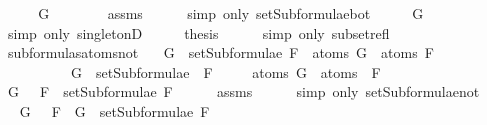 \begin{isabellebody}
%
\isadelimproof
%
\endisadelimproof
%
\isatagproof
{}\isamarkupfalse%
\ {\isacharminus}\isanewline
\ \ \isamarkupfalse%
\ {\isachardoublequoteopen}G\ {\isasymin}\ {\isacharbraceleft}{\isasymbottom}{\isacharbraceright}{\isachardoublequoteclose}\isanewline
\ \ \ \ \isamarkupfalse%
\ assms\isanewline
\ \ \ \ \isamarkupfalse%
\ {\isacharparenleft}simp\ only{\isacharcolon}\ setSubformulae{\isacharunderscore}bot{\isacharparenright}\isanewline
\ \ \isamarkupfalse%
\ \isamarkupfalse%
\ {\isachardoublequoteopen}G\ {\isacharequal}\ {\isasymbottom}{\isachardoublequoteclose}\isanewline
\ \ \ \ \isamarkupfalse%
\ {\isacharparenleft}simp\ only{\isacharcolon}\ singletonD{\isacharparenright}\isanewline
\ \ \isamarkupfalse%
\ \isamarkupfalse%
\ {\isacharquery}thesis\isanewline
\ \ \ \ \isamarkupfalse%
\ {\isacharparenleft}simp\ only{\isacharcolon}\ subset{\isacharunderscore}refl{\isacharparenright}\isanewline
{}\isamarkupfalse%
%
\endisatagproof
{\isafoldproof}%
%
\isadelimproof
\isanewline
%
\endisadelimproof
\isanewline
{}\isamarkupfalse%
\ subformulas{\isacharunderscore}atoms{\isacharunderscore}not{\isacharcolon}\isanewline
\ \ \ {\isachardoublequoteopen}G\ {\isasymin}\ setSubformulae\ F\ {\isasymLongrightarrow}\ atoms\ G\ {\isasymsubseteq}\ atoms\ F{\isachardoublequoteclose}\isanewline
\ \ \ \ \ \ \ \ \ \ {\isachardoublequoteopen}G\ {\isasymin}\ setSubformulae\ {\isacharparenleft}\isactrlbold {\isasymnot}\ F{\isacharparenright}{\isachardoublequoteclose}\isanewline
\ \ \ \ \ {\isachardoublequoteopen}atoms\ G\ {\isasymsubseteq}\ atoms\ {\isacharparenleft}\isactrlbold {\isasymnot}\ F{\isacharparenright}{\isachardoublequoteclose}\isanewline
%
\isadelimproof
%
\endisadelimproof
%
\isatagproof
{}\isamarkupfalse%
\ {\isacharminus}\isanewline
\ \ \isamarkupfalse%
\ {\isachardoublequoteopen}G\ {\isasymin}\ {\isacharbraceleft}\isactrlbold {\isasymnot}\ F{\isacharbraceright}\ {\isasymunion}\ setSubformulae\ F{\isachardoublequoteclose}\isanewline
\ \ \ \ \isamarkupfalse%
\ assms{\isacharparenleft}{}{\isacharparenright}\isanewline
\ \ \ \ \isamarkupfalse%
\ {\isacharparenleft}simp\ only{\isacharcolon}\ setSubformulae{\isacharunderscore}not{\isacharparenright}\ \isanewline
\ \ \isamarkupfalse%
\ \isamarkupfalse%
\ {\isachardoublequoteopen}G\ {\isasymin}\ {\isacharbraceleft}\isactrlbold {\isasymnot}\ F{\isacharbraceright}\ {\isasymor}\ G\ {\isasymin}\ setSubformulae\ F{\isachardoublequoteclose}\isanewline

\end{isabellebody}
